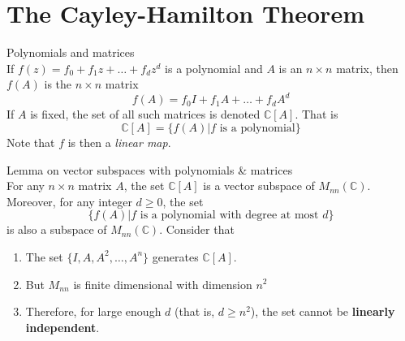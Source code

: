 \documentclass[journal, letterpaper]{IEEEtran}
\begin{document}
    \section{The Cayley-Hamilton Theorem}
    \begin{mybox}{Polynomials and matrices} \\ 
        If $f(z) = f_0 + f_1z + \dots + f_dz^d$ is a polynomial and $A$ is an $n\times n$ matrix, then 
        $f(A)$ is the $n\times n$ matrix
        $$ f(A) = f_0I +f_1A + \dots + f_dA^d$$
        If $A$ is fixed, the set of all such matrices is denoted $\mathbb{C}[A]$. That is
        $$ \mathbb{C}[A] = \{f(A) | f \text{ is a polynomial} \}$$
        Note that $f$ is then a \textit{linear map}.
    \end{mybox}
    \begin{myboxr}{Lemma on vector subspaces with polynomials \& matrices} \\ 
        For any $n \times n$ matrix $A$, the set $\mathbb{C}[A]$ is a vector subspace of $M_{nn}(\mathbb{C})$. 
        Moreover, for any integer $d \ge 0$, the set
        $$ \{f(A) | f \text{ is a polynomial with degree at most $d$} \}$$
        is also a subspace of $M_{nn}(\mathbb{C})$. Consider that 
        \begin{enumerate}
            \item The set $\{I, A, A^2, \dots, A^n\}$ generates $\mathbb{C}[A]$.
            \item But $M_{nn}$ is finite dimensional with dimension $n^2$
            \item Therefore, for large enough $d$ (that is, $d \ge n^2$), the set cannot be \textbf{linearly independent}.
        \end{enumerate}
    \end{myboxr}
\end{document}
